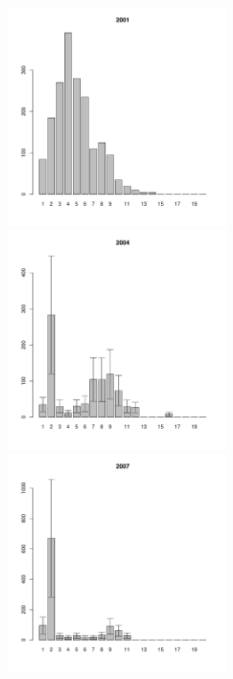 \documentclass[12pt, a4paper]{article}
\begin{document}
\begin{figure}[h]

\begin{multicols}{3}
\hfill
\includegraphics[width=65mm]{../White_Sea/Luvenga_Goreliy/middle_2001_.pdf}
\hfill
\includegraphics[width=65mm]{../White_Sea/Luvenga_Goreliy/middle_2004_.pdf}
\hfill
\includegraphics[width=65mm]{../White_Sea/Luvenga_Goreliy/middle_2007_.pdf}
\end{multicols}


\end{figure}
\end{document}
